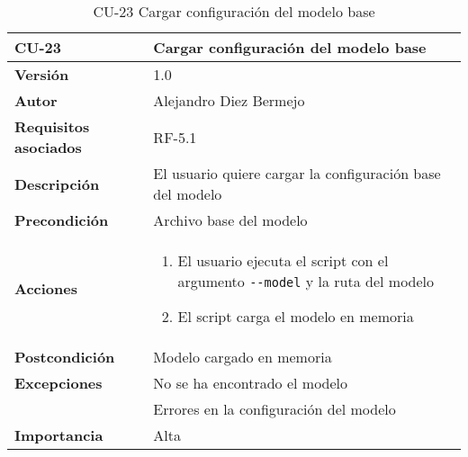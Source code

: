 \begin{table}[p]
	\centering
	\begin{tabularx}{\linewidth}{ p{} p{} }
		\toprule
		\textbf{CU-23}    & \textbf{Cargar configuración del modelo base}\\
		\toprule
		\textbf{Versión}              & 1.0    \\
		\textbf{Autor}                & Alejandro Diez Bermejo \\
		\textbf{Requisitos asociados} & RF-5.1 \\
		\textbf{Descripción}          & El usuario quiere cargar la configuración base del modelo \\
        \textbf{Precondición}         & Archivo base del modelo \\
		\textbf{Acciones}             &
		\begin{enumerate}
			\def\labelenumi{\arabic{enumi}.}
			\tightlist
            \item El usuario ejecuta el script con el argumento \texttt{-{}-model} y la ruta del modelo
            \item El script carga el modelo en memoria
		\end{enumerate}\\
		\textbf{Postcondición}        & Modelo cargado en memoria \\
		\textbf{Excepciones}          & No se ha encontrado el modelo \\
                                      & Errores en la configuración del modelo \\
		\textbf{Importancia}          & Alta \\
		\bottomrule
	\end{tabularx}
	\caption{CU-23 Cargar configuración del modelo base}
\end{table}

